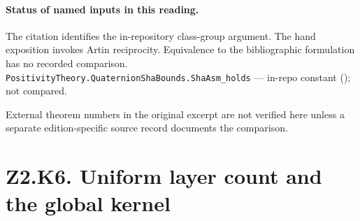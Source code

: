 
\paragraph{Status of named inputs in this reading.}
The citation identifies the in-repository class-group argument. The hand exposition invokes Artin reciprocity. Equivalence to the bibliographic formulation has no recorded comparison.
\noindent\nolinkurl{PositivityTheory.QuaternionShaBounds.ShaAsm_holds} --- in-repo constant (); not compared.\par
External theorem numbers in the original excerpt are not verified here unless a separate edition-specific source record documents the comparison.

\section*{Z2.K6. Uniform layer count and the global kernel}

